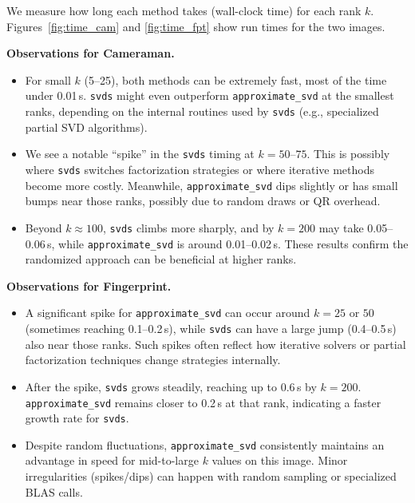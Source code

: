 \documentclass[11pt,a4paper, margin=1in]{article}
\begin{document}
\begin{enumerate}
    We measure how long each method takes (wall-clock time) for each rank $k$. 
    Figures~\ref{fig:time_cam} and \ref{fig:time_fpt} show run times 
    for the two images.

    \textbf{Observations for Cameraman.}
    \begin{itemize}
      \item For small $k$ (5--25), both methods can be extremely fast, 
      most of the time under 0.01\,s. \texttt{svds} might even outperform 
      \texttt{approximate\_svd} at the smallest ranks, 
      depending on the internal routines used by \texttt{svds} 
      (e.g., specialized partial SVD algorithms).
      
      \item We see a notable “spike” in the \texttt{svds} timing 
      at $k=50$--$75$. This is possibly where \texttt{svds} switches 
      factorization strategies or where iterative methods 
      become more costly. Meanwhile, \texttt{approximate\_svd} 
      dips slightly or has small bumps near those ranks, 
      possibly due to random draws or QR overhead.
      
      \item Beyond $k\approx 100$, \texttt{svds} climbs more sharply, 
      and by $k=200$ may take 0.05--0.06\,s, while 
      \texttt{approximate\_svd} is around 0.01--0.02\,s. 
      These results confirm the randomized approach can be 
      beneficial at higher ranks.
    \end{itemize}

    \textbf{Observations for Fingerprint.}
    \begin{itemize}
      \item A significant spike for \texttt{approximate\_svd} can occur 
      around $k=25$ or $50$ (sometimes reaching 0.1--0.2\,s), 
      while \texttt{svds} can have a large jump (0.4--0.5\,s) 
      also near those ranks. 
      Such spikes often reflect how iterative solvers or 
      partial factorization techniques change strategies internally.
      
      \item After the spike, \texttt{svds} grows steadily, 
      reaching up to 0.6\,s by $k=200$. \texttt{approximate\_svd} 
      remains closer to 0.2\,s at that rank, indicating 
      a faster growth rate for \texttt{svds}.
      
      \item Despite random fluctuations, \texttt{approximate\_svd} 
      consistently maintains an advantage in speed 
      for mid-to-large $k$ values on this image. 
      Minor irregularities (spikes/dips) can happen 
      with random sampling or specialized BLAS calls.
    \end{itemize}


\end{enumerate}
\end{document}
